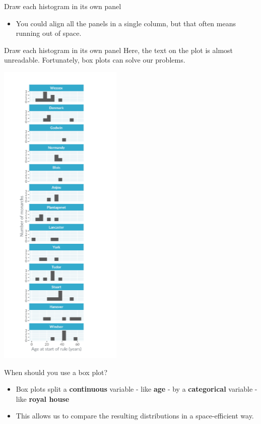 \documentclass[
  ignorenonframetext,
]{beamer}
\providecommand{\tightlist}{%
  \setlength{\itemsep}{0pt}\setlength{\parskip}{0pt}}
\begin{document}
\begin{frame}{Draw each histogram in its own panel}
\label{draw-each-histogram-in-its-own-panel-5}
\begin{itemize}
\tightlist
\item
  You could align all the panels in a single column, but that often
  means running out of space.
\end{itemize}
\end{frame}

\begin{frame}{Draw each histogram in its own panel}
\label{draw-each-histogram-in-its-own-panel-6}
Here, the text on the plot is almost unreadable. Fortunately, box plots
can solve our problems.

\includegraphics{../images/im21.png}
\end{frame}

\begin{frame}{When should you use a box plot?}
\label{when-should-you-use-a-box-plot}
\begin{itemize}
\item
  Box plots split a \textbf{continuous} variable - like \textbf{age} -
  by a \textbf{categorical} variable - like \textbf{royal house}
\item
  This allows us to compare the resulting distributions in a
  space-efficient way.
\end{itemize}
\end{frame}
\end{document}
